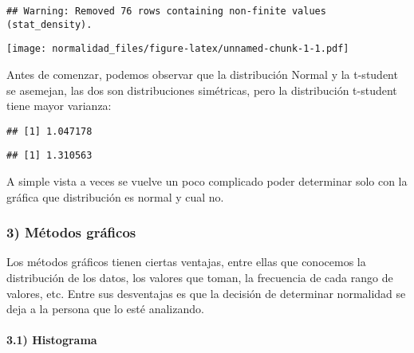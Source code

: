 \documentclass[
]{article}
\newenvironment{Shaded}{\begin{snugshade}}{\end{snugshade}}
\newcommand{\FunctionTok}[1]{\textcolor[rgb]{0.00,0.00,0.00}{#1}}
\newcommand{\NormalTok}[1]{#1}
\newcommand{\SpecialCharTok}[1]{\textcolor[rgb]{0.00,0.00,0.00}{#1}}
\begin{document}
\begin{verbatim}
## Warning: Removed 76 rows containing non-finite values (stat_density).
\end{verbatim}

\texttt{[image: normalidad\_files/figure-latex/unnamed-chunk-1-1.pdf]}

Antes de comenzar, podemos observar que la distribución Normal y la
t-student se asemejan, las dos son distribuciones simétricas, pero la
distribución t-student tiene mayor varianza:

\begin{Shaded}
\end{Shaded}

\begin{verbatim}
## [1] 1.047178
\end{verbatim}

\begin{Shaded}
\end{Shaded}

\begin{verbatim}
## [1] 1.310563
\end{verbatim}

A simple vista a veces se vuelve un poco complicado poder determinar
solo con la gráfica que distribución es normal y cual no.

\hypertarget{muxe9todos-gruxe1ficos}{%
\subsubsection{3) Métodos gráficos}\label{muxe9todos-gruxe1ficos}}

Los métodos gráficos tienen ciertas ventajas, entre ellas que conocemos
la distribución de los datos, los valores que toman, la frecuencia de
cada rango de valores, etc. Entre sus desventajas es que la decisión de
determinar normalidad se deja a la persona que lo esté analizando.

\hypertarget{histograma}{%
\paragraph{3.1) Histograma}\label{histograma}}
\end{document}
